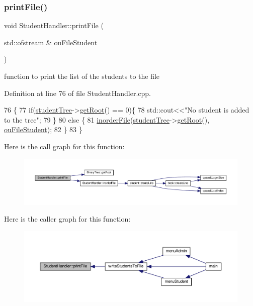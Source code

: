 \subsubsection{\texorpdfstring{print\+File()}{printFile()}}
{\footnotesize\ttfamily void Student\+Handler\+::print\+File (\begin{DoxyParamCaption}\item[{std\+::ofstream \&}]{ou\+File\+Student }\end{DoxyParamCaption})}

function to print the list of the students to the file 

Definition at line 76 of file Student\+Handler.\+cpp.


\begin{DoxyCode}
76                                                          \{
77     \textcolor{keywordflow}{if}(\hyperlink{class_student_handler_a7141eccd57a30aa140e5b4e92b0939ea}{studentTree}->\hyperlink{class_binary_tree_a9ee0cf09781cf2ecc471aacc61848dde}{getRoot}() == 0)\{
78         std::cout<<\textcolor{stringliteral}{"No student is added to the tree"};
79     \}
80     \textcolor{keywordflow}{else} \{
81         \hyperlink{class_student_handler_a61f541e2aa02759a3213a9bceecf125c}{inorderFile}(\hyperlink{class_student_handler_a7141eccd57a30aa140e5b4e92b0939ea}{studentTree}->\hyperlink{class_binary_tree_a9ee0cf09781cf2ecc471aacc61848dde}{getRoot}(),
      \hyperlink{_library_mananagement_system_8cpp_a2e073350989a922d101f00447e52dfc6}{ouFileStudent});
82     \}
83 \}
\end{DoxyCode}
Here is the call graph for this function\+:
\nopagebreak
\begin{figure}[H]
\begin{center}
\leavevmode
\includegraphics[width=350pt]{class_student_handler_a8049bb821d2a0a951600ab79c6ee4e27_cgraph}
\end{center}
\end{figure}
Here is the caller graph for this function\+:
\nopagebreak
\begin{figure}[H]
\begin{center}
\leavevmode
\includegraphics[width=350pt]{class_student_handler_a8049bb821d2a0a951600ab79c6ee4e27_icgraph}
\end{center}
\end{figure}


